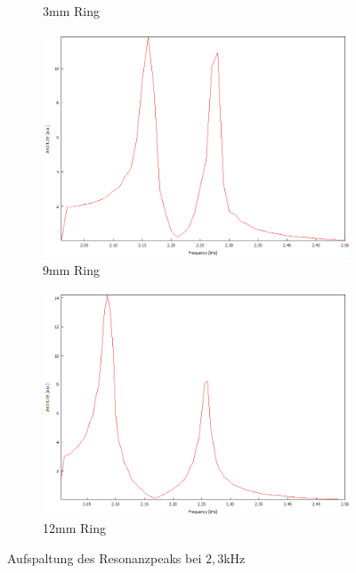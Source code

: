 \begin{figure}
\begin{subfigure}{0.4\textwidth}
    \caption{3mm Ring}
  \end{subfigure}
  \begin{subfigure}{0.4\textwidth}
    \centering
    \includegraphics[width=\textwidth]{Bilder/PC_Kugelresonator/180_2000-2500_9mmRing.png}
    \caption{9mm Ring}
  \end{subfigure}
  \begin{subfigure}{0.4\textwidth}
    \centering
    \includegraphics[width=\textwidth]{Bilder/PC_Kugelresonator/180_2000-2500_12mmRing.png}
    \caption{12mm Ring}
  \end{subfigure}
  \caption{Aufspaltung des Resonanzpeaks bei $2,3$kHz}
  \label{fig:kugel_ring}
\end{figure}

